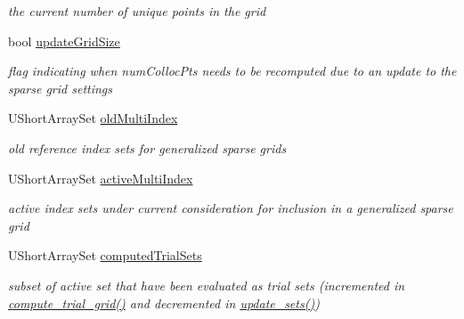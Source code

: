 \begin{DoxyCompactItemize}
\begin{DoxyCompactList}\small\item\em the current number of unique points in the grid \end{DoxyCompactList}\item 
bool \hyperlink{classPecos_1_1SparseGridDriver_a467d131ddb4afdf1aaf1e51ce80d7c34}{update\+Grid\+Size}\label{classPecos_1_1SparseGridDriver_a467d131ddb4afdf1aaf1e51ce80d7c34}

\begin{DoxyCompactList}\small\item\em flag indicating when num\+Colloc\+Pts needs to be recomputed due to an update to the sparse grid settings \end{DoxyCompactList}\item 
U\+Short\+Array\+Set \hyperlink{classPecos_1_1SparseGridDriver_ad094d26247e8a76f1be950237f87ef10}{old\+Multi\+Index}\label{classPecos_1_1SparseGridDriver_ad094d26247e8a76f1be950237f87ef10}

\begin{DoxyCompactList}\small\item\em old reference index sets for generalized sparse grids \end{DoxyCompactList}\item 
U\+Short\+Array\+Set \hyperlink{classPecos_1_1SparseGridDriver_a92b39545b39e5b55d2a3d8a9c219e135}{active\+Multi\+Index}\label{classPecos_1_1SparseGridDriver_a92b39545b39e5b55d2a3d8a9c219e135}

\begin{DoxyCompactList}\small\item\em active index sets under current consideration for inclusion in a generalized sparse grid \end{DoxyCompactList}\item 
U\+Short\+Array\+Set \hyperlink{classPecos_1_1SparseGridDriver_a898e086f11334c27f24f815e9f31d2df}{computed\+Trial\+Sets}\label{classPecos_1_1SparseGridDriver_a898e086f11334c27f24f815e9f31d2df}

\begin{DoxyCompactList}\small\item\em subset of active set that have been evaluated as trial sets (incremented in \hyperlink{classPecos_1_1SparseGridDriver_a392163a55c3c5c2b4357b5490009df62}{compute\+\_\+trial\+\_\+grid()} and decremented in \hyperlink{classPecos_1_1SparseGridDriver_ab1c5960af8466c6878fe3c35996c0ae3}{update\+\_\+sets()}) \end{DoxyCompactList}\end{DoxyCompactItemize}
